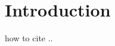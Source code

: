 \chapter{Introduction}

how to cite .. 
\citep{anderson2018bottom}
\cite{anderson2018bottom}
\citet{anderson2018bottom}
%
\lipsum[2-4]